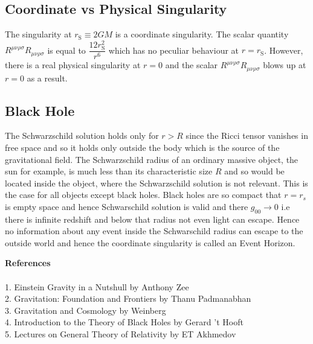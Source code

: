 ﻿\documentclass[12pt,a4paper]{article}
\begin{document}
\subsection{Coordinate vs Physical Singularity}
The singularity at $r _ { \mathrm { S } } \equiv 2 G M$ is a coordinate singularity. The scalar quantity $R ^ { \mu \nu \rho \sigma } R _ { \mu \nu \rho \sigma }$ is equal to $\dfrac { 12 r _ { \mathrm { S } } ^ { 2 } } { r ^ { 6 } }$ which has no peculiar behaviour at $r = r _ { \mathrm { S } }$. However, there is a real physical singularity at $r = 0$ and the scalar $R ^ { \mu \nu \rho \sigma } R _ { \mu \nu \rho \sigma }$ blows up at $r = 0$ as a result. 

\subsection{Black Hole}
The Schwarzschild solution holds only for $r > R$ since the Ricci tensor vanishes in free space and so it holds only outside the body which is the source of the gravitational field. The Schwarzschild radius of an ordinary massive object, the sun for example, is much less than its characteristic size $R$ and so would be located inside the object, where the Schwarzschild solution is not relevant. This is the case for all objects except black holes. Black holes are so compact that $r=r_{s}$ is empty space and hence Schwarschild solution is valid and there $g_{00} \rightarrow 0$ i.e there is infinite redshift and below that radius not even light can escape. Hence no information about any event inside the Schwarschild radius can escape to the outside world and hence the coordinate singularity is called an Event Horizon.







\newpage
\textbf{References}\\\\
1. Einstein Gravity in a Nutshull by Anthony Zee\\
2. Gravitation: Foundation and Frontiers by Thanu Padmanabhan\\
3. Gravitation and Cosmology by Weinberg\\
4. Introduction to the Theory of Black Holes by Gerard ’t Hooft\\
5. Lectures on General Theory of Relativity by ET Akhmedov
\\ \\
\end{document}
